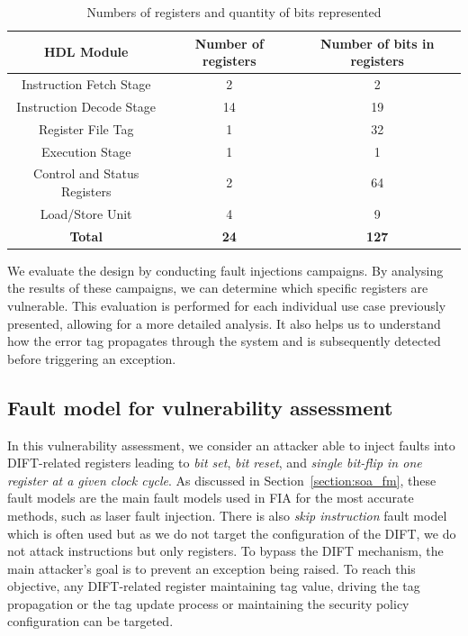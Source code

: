 \begin{table}[t]
    \centering
    \footnotesize
    \caption{Numbers of registers and quantity of bits represented}
    \label{tab:registersDIFT}
    \begin{tabular}{@{}ccc@{}}
        \toprule
        \textbf{HDL Module} & \textbf{Number of registers} & \textbf{Number of bits in registers} \\ \midrule
        Instruction Fetch Stage & 2 & 2 \\
        Instruction Decode Stage & 14 & 19 \\
        Register File Tag & 1 & 32 \\
        Execution Stage & 1 & 1 \\
        Control and Status Registers & 2 & 64 \\
        Load/Store Unit & 4 & 9 \\
        \midrule
        \midrule
        \textbf{Total} & \textbf{\textbf{24}} & \textbf{\textbf{127}} \\
        \bottomrule
    \end{tabular}
\end{table}

We evaluate the design by conducting fault injections campaigns. By analysing the results of these campaigns, we can determine which specific registers are vulnerable. This evaluation is performed for each individual use case previously presented, allowing for a more detailed analysis. It also helps us to understand how the error tag propagates through the system and is subsequently detected before triggering an exception.

\subsection{Fault model for vulnerability assessment}
In this vulnerability assessment, we consider an attacker able to inject faults into DIFT-related registers leading to \textit{bit set}, \textit{bit reset}, and \textit{single bit-flip in one register at a given clock cycle}. 
As discussed in Section~\ref{section:soa_fm}, these fault models are the main fault models used in FIA for the most accurate methods, such as laser fault injection. There is also \textit{skip instruction} fault model which is often used but as we do not target the configuration of the DIFT, we do not attack instructions but only registers.
To bypass the DIFT mechanism, the main attacker's goal is to prevent an exception being raised. To reach this objective, any DIFT-related register maintaining tag value, driving the tag propagation or the tag update process or maintaining the security policy configuration can be targeted.


